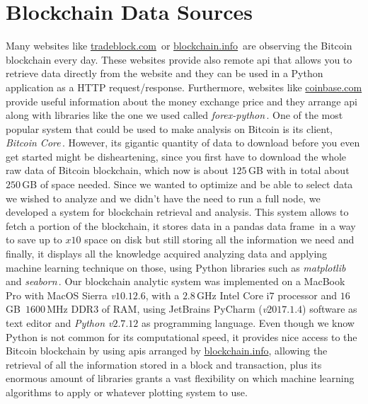 \documentclass[USenglish]{uit-thesis}
\begin{document}
\section{Blockchain Data Sources}
Many websites like \url{tradeblock.com}\,\cite{tradeblock}
or \url{blockchain.info}\,\cite{bitcoin_blockchain}
are observing the Bitcoin blockchain every day.
These websites provide also remote \gls{api} 
that allows you to retrieve data directly from
the website and they can be used in a Python application
as a HTTP request/response. Furthermore, websites like
\url{coinbase.com} provide useful information about the
money exchange price and they arrange \gls{api} along with
libraries like the one we used called
\emph{forex-python}\,\cite{forex-python}.
One of the most popular system that could be used
to make analysis on Bitcoin is its client, \emph{Bitcoin Core}\,\cite{bitcoincore}.
However, its gigantic quantity of data to download before you
even get started might be disheartening, since you first
have to download the whole raw data of Bitcoin blockchain, which
now is about $125$\,GB with in total about $250$\,GB of
space needed. Since we wanted to optimize and
be able to select data we wished to analyze and
we didn't have the need to run a full node,
we developed a system for blockchain retrieval and analysis.
This system allows to fetch a portion of the blockchain, it
stores data in a pandas data frame\,\cite{pandas} in a way to save
up to $x10$ space on disk but still storing all the information
we need and finally, it displays all the knowledge acquired
analyzing data and applying machine learning technique
on those, using Python libraries
such as \emph{matplotlib}\,\cite{matplotlib} and
\emph{seaborn}\,\cite{michael_waskom_seaborn}.
Our blockchain analytic system was implemented
on a MacBook Pro with MacOS Sierra \emph{v$10.12.6$},
with a $2.8$\,GHz Intel Core i$7$ processor
and $16$\,GB~$1600$\,MHz DDR3 of RAM, using
JetBrains PyCharm (\emph{v$2017.1.4$}) software as
text editor and \emph{Python v$2.7.12$}
as programming language. Even though we know
Python is not common for its computational speed,
it provides nice access to the
Bitcoin blockchain by using \gls{api}s arranged
by \url{blockchain.info}, allowing the retrieval
of all the information stored in a block and transaction,
plus its enormous amount of libraries grants
a vast flexibility on which machine learning algorithms
to apply or whatever plotting system to use. 
\end{document}
